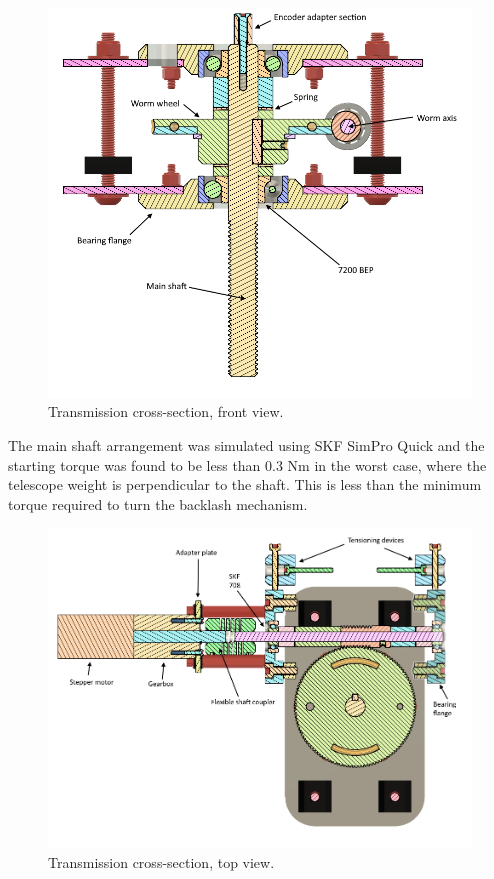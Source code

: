\begin{figure}[H]
	\centering 
	\includegraphics[scale=0.7]{4-experiment-design/img/mechanical/Gearbox_CS.png}
	\caption{Transmission cross-section, front view.}
	\label{fig::mechanical::gear_cs}
\end{figure}

The main shaft arrangement was simulated using SKF SimPro Quick \cite{SKF} and the starting torque was found to be less than 0.3 Nm in the worst case, where the telescope weight is perpendicular to the shaft. This is less than the minimum torque required to turn the backlash mechanism. 

\begin{figure}[H]
	\centering 
	\includegraphics[scale=0.6]{4-experiment-design/img/mechanical/Wormshaft_CS.png}
	\caption{Transmission cross-section, top view.}
	\label{fig::mechanical::worm_cs}
\end{figure}

